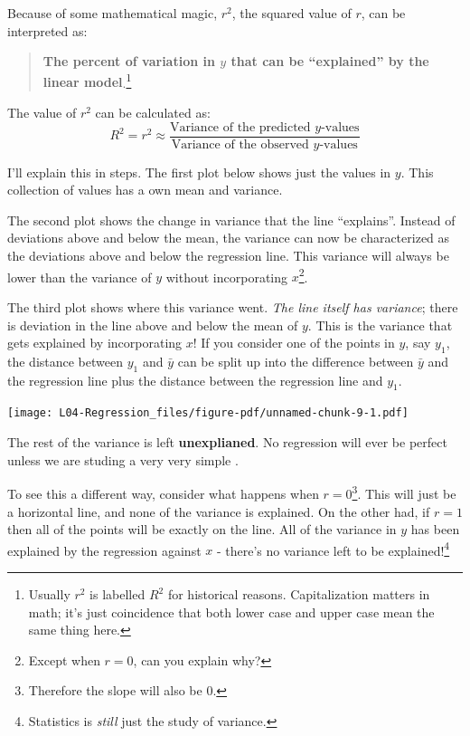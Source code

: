 \documentclass[
  letterpaper,
  DIV=11,
  numbers=noendperiod,
  oneside]{scrreprt}
\begin{document}
Because of some mathematical magic, \(r^2\), the squared value of \(r\),
can be interpreted as:

\begin{quote}
\textbf{The percent of variation in \(y\) that can be ``explained'' by
the linear model}.\footnote{Usually \(r^2\) is labelled \(R^2\) for
  historical reasons. Capitalization matters in math; it's just
  coincidence that both lower case and upper case mean the same thing
  here.}
\end{quote}

The value of \(r^2\) can be calculated as: \[
R^2 = r^2 \approx \frac{\text{Variance of the predicted }y\text{-values}}{\text{Variance of the observed }y\text{-values}}
\]

I'll explain this in steps. The first plot below shows just the values
in \(y\). This collection of values has a own mean and variance.

The second plot shows the change in variance that the line ``explains''.
Instead of deviations above and below the mean, the variance can now be
characterized as the deviations above and below the regression line.
This variance will always be lower than the variance of \(y\) without
incorporating \(x\)\footnote{Except when \(r=0\), can you explain why?}.

The third plot shows where this variance went. \emph{The line itself has
variance}; there is deviation in the line above and below the mean of
\(y\). This is the variance that gets explained by incorporating \(x\)!
If you consider one of the points in \(y\), say \(y_1\), the distance
between \(y_1\) and \(\bar y\) can be split up into the difference
between \(\bar y\) and the regression line plus the distance between the
regression line and \(y_1\).

\texttt{[image: L04-Regression\_files/figure-pdf/unnamed-chunk-9-1.pdf]}

The rest of the variance is left \textbf{unexplianed}. No regression
will ever be perfect unless we are studing a very very simple .

To see this a different way, consider what happens when
\(r = 0\)\footnote{Therefore the slope will also be 0.}. This will just
be a horizontal line, and none of the variance is explained. On the
other had, if \(r = 1\) then all of the points will be exactly on the
line. All of the variance in \(y\) has been explained by the regression
against \(x\) - there's no variance left to be explained!\footnote{Statistics
  is \emph{still} just the study of variance.}
\end{document}
